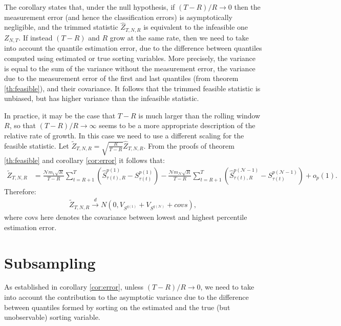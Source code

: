 \noindent
The corollary states that, under the null hypothesis, if $\left( T-R\right)/R \rightarrow 0$ then the measurement error (and hence the classification errors) is asymptotically negligible, and the trimmed statistic $\widehat{Z}_{T,N,R}$ is equivalent to the infeasible one $Z_{N,T}$. If instead $\left( T-R\right)$ and $R$ grow at the same rate, then we need to take into account the quantile estimation error, due to the difference between quantiles computed using estimated or true sorting variables. More precisely, the variance is equal to the sum of the variance without the measurement error, the variance due to the measurement error of the first and last quantiles (from theorem \ref{th:feasible}), and their covariance. It follows that the trimmed feasible statistic is unbiased, but has higher variance than the infeasible statistic.

In practice, it may be the case that $T-R$ is much larger than the rolling window $R$, so that $(T-R)/R\rightarrow \infty$ seems to be a more appropriate description of the relative rate of growth. In this case we need to use a different scaling for the feasible statistic. Let $\widetilde{Z}_{T,N,R} = \sqrt{\frac{R}{T-R}} \widehat{Z}_{T,N,R}$. From the proofs of theorem \ref{th:feasible} and corollary \ref{cor:error} it follows that:
\begin{align*}
	\widetilde{Z}_{T,N,R} &= \frac{\mathcal{N} m_{1} \sqrt{R}}{T-R} \sum_{t=R+1}^{T} \left( \widehat{S}_{\tau(t),R}^{p(1)}-S_{\tau(t) }^{p(1)}\right) -\frac{\mathcal{N} m_{\mathcal{N}} \sqrt{R}}{T-R}\sum_{t=R+1}^{T} \left(\widehat{S}_{\tau(t),R}^{p(\mathcal{N}-1)}-S_{\tau(t) }^{p(\mathcal{N}-1)}\right) +o_{p}(1).
\end{align*}
Therefore: 
\begin{align*}
	\widetilde{Z}_{T,N,R}\overset{d}{\rightarrow }N\left(0, V_{S^{q(1)}}+V_{S^{q(\mathcal{N})}}+ covs\right), 
\end{align*}
where \textrm{covs} here denotes the covariance between lowest and highest percentile estimation error. 



\section{Subsampling}
\label{Subsampling}

As established in corollary \ref{cor:error}, unless $(T-R)/R\rightarrow 0$, we need to take into account the contribution to the asymptotic variance due to the difference between quantiles formed by sorting on the estimated and the true (but unobservable) sorting variable.

